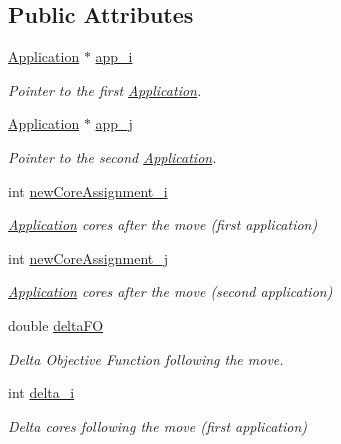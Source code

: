 \subsection*{Public Attributes}
\begin{DoxyCompactItemize}
\item 
\hyperlink{classApplication}{Application} $\ast$ \hyperlink{classCandidate_a1bfed0429bba41f57dce0fbd37225c2c}{app\-\_\-i}
\begin{DoxyCompactList}\small\item\em Pointer to the first \hyperlink{classApplication}{Application}. \end{DoxyCompactList}\item 
\hyperlink{classApplication}{Application} $\ast$ \hyperlink{classCandidate_a8b0f26e8b45e9a3331be8a9694d3be5e}{app\-\_\-j}
\begin{DoxyCompactList}\small\item\em Pointer to the second \hyperlink{classApplication}{Application}. \end{DoxyCompactList}\item 
int \hyperlink{classCandidate_a859313416296683b7c0496d842dab48a}{new\-Core\-Assignment\-\_\-i}
\begin{DoxyCompactList}\small\item\em \hyperlink{classApplication}{Application} cores after the move (first application) \end{DoxyCompactList}\item 
int \hyperlink{classCandidate_a1203966358bd849169b5f967de3c2bf7}{new\-Core\-Assignment\-\_\-j}
\begin{DoxyCompactList}\small\item\em \hyperlink{classApplication}{Application} cores after the move (second application) \end{DoxyCompactList}\item 
double \hyperlink{classCandidate_a1bfc07aae3b3914bba57e057936399e7}{delta\-F\-O}
\begin{DoxyCompactList}\small\item\em Delta Objective Function following the move. \end{DoxyCompactList}\item 
int \hyperlink{classCandidate_ab1033e1f3e0060f0773c7d9268c2ce0b}{delta\-\_\-i}
\begin{DoxyCompactList}\small\item\em Delta cores following the move (first application) \end{DoxyCompactList}\item 

\end{DoxyCompactItemize}
